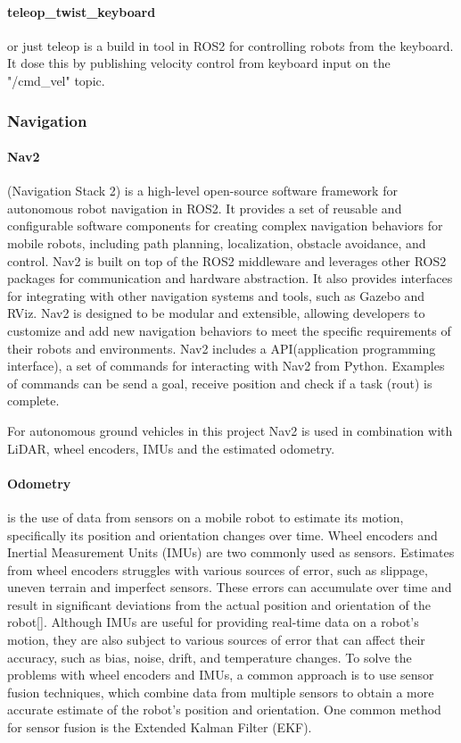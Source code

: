 \paragraph{teleop\_twist\_keyboard} or just teleop is a build in tool in ROS2 for controlling robots from the keyboard. It dose this by publishing velocity control from keyboard input on the "/cmd\_vel" topic.   

\subsubsection{Navigation} 

\paragraph{Nav2} (Navigation Stack 2) \cite{rosnavigation} is a high-level open-source software framework for autonomous robot navigation in ROS2. It provides a set of reusable and configurable software components for creating complex navigation behaviors for mobile robots, including path planning, localization, obstacle avoidance, and control. Nav2 is built on top of the ROS2 middleware and leverages other ROS2 packages for communication and hardware abstraction. It also provides interfaces for integrating with other navigation systems and tools, such as Gazebo and RViz. Nav2 is designed to be modular and extensible, allowing developers to customize and add new navigation behaviors to meet the specific requirements of their robots and environments.
Nav2 includes a API(application programming interface)\cite{rosnavAPI}, a set of commands for interacting with Nav2 from Python. Examples of commands can be send a goal, receive position and check if a task (rout) is complete.  

For autonomous ground vehicles in this project Nav2 is used in combination with LiDAR, wheel encoders, IMUs and the estimated odometry. 

\paragraph{Odometry} is the use of data from sensors on a mobile robot to estimate its motion, specifically its position and orientation changes over time. Wheel encoders and Inertial Measurement Units (IMUs) are two commonly used as sensors. Estimates from wheel encoders struggles with various sources of error, such as slippage, uneven terrain and imperfect sensors. These errors can accumulate over time and result in significant deviations from the actual position and orientation of the robot[]. Although IMUs are useful for providing real-time data on a robot's motion, they are also subject to various sources of error that can affect their accuracy, such as bias, noise, drift, and temperature changes. 
To solve the problems with wheel encoders and IMUs, a common approach is to use sensor fusion techniques, which combine data from multiple sensors to obtain a more accurate estimate of the robot's position and orientation. One common method for sensor fusion is the Extended Kalman Filter (EKF). 


